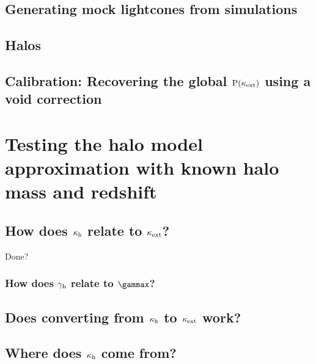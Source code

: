 \documentclass[useAMS,usenatbib]{mn2e}
\begin{document}
\subsection{Generating mock lightcones from simulations}


\subsection{Halos}
\label{subsec:halos}


\subsection{Calibration: Recovering the global ${\rm P}(\kappa_{\rm ext})$ using a void correction}
\label{subsec:voids}



\section{Testing the halo model approximation with known halo mass and redshift}
\label{sec:knownMh+z} 

\subsection{How does $\kappa_{\rm h}$ relate to $\kappa_{\rm ext}$?}
Done?
\subsubsection{How does $\gamma_{\rm h}$ relate to $\gammax$?}
\subsection{Does converting from $\kappa_{\rm h}$ to $\kappa_{\rm ext}$ work?}

\subsection{Where does $\kappa_{\rm h}$ come from?}
\end{document}
